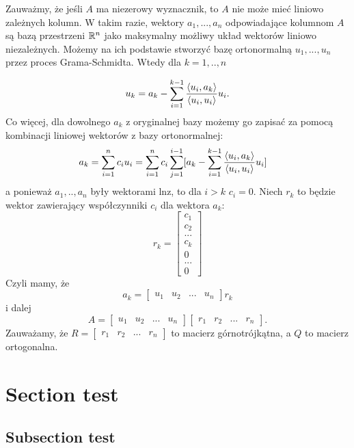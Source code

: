 \documentclass{article}
\begin{document}
\begin{dygresja}
Zauważmy, że jeśli $A$ ma niezerowy wyznacznik, to $A$ nie może mieć liniowo zależnych kolumn. W takim razie, wektory $a_1,...,a_n$ odpowiadające kolumnom $A$ są bazą przestrzeni $\mathbb{R}^n$ jako maksymalny możliwy układ wektorów liniowo niezależnych. Możemy na ich podstawie stworzyć bazę ortonormalną $u_1,...,u_n$ przez proces Grama-Schmidta. Wtedy dla $k=1,..,n$
\end{dygresja}
$$u_k=a_k-\sum\limits_{i=1}^{k-1}{\langle u_i,a_k\rangle\over \langle u_i,u_i\rangle}u_i.$$
Co więcej, dla dowolnego $a_k$ z oryginalnej bazy możemy go zapisać za pomocą kombinacji liniowej wektorów z bazy ortonormalnej:
\begin{align*}
    a_k&=\sum\limits_{i=1}^n c_iu_i=\sum\limits_{i=1}^nc_i\sum\limits_{j=1}^{i-1} [a_k-\sum\limits_{i=1}^{k-1}{\langle u_i,a_k\rangle\over \langle u_i,u_i\rangle}u_i]
\end{align*}
a ponieważ $a_1,..,a_n$ były wektorami lnz, to dla $i> k$ $c_i=0$. Niech $r_k$ to będzie wektor zawierający współczynniki $c_i$ dla wektora $a_k$:
$$r_k=\begin{bmatrix}
    c_1\\
    c_2\\
    ...\\
    c_k\\
    0\\
    ...\\
    0
\end{bmatrix}$$
Czyli mamy, że
$$a_k=\begin{bmatrix}
    u_1&u_2&...&u_n
\end{bmatrix}r_k
$$
i dalej
$$
A=\begin{bmatrix}
    u_1&u_2&...&u_n
\end{bmatrix}\begin{bmatrix}
    r_1&r_2&...&r_n
\end{bmatrix}.
$$
Zauważamy, że $R=\begin{bmatrix}
    r_1&r_2&...&r_n
\end{bmatrix}$ to macierz górnotrójkątna, a $Q$ to macierz ortogonalna.

\section{Section test}

\subsection{Subsection test}
\end{document}
